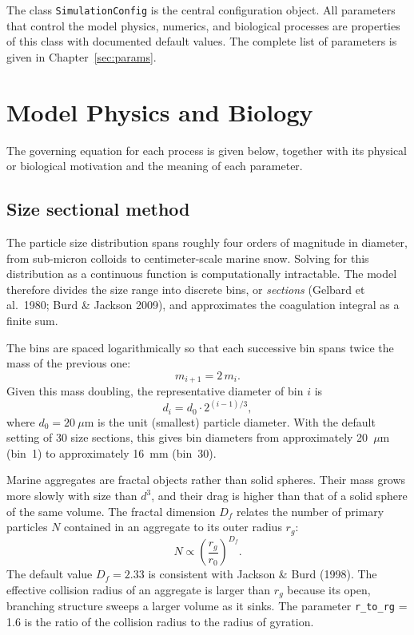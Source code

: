 \documentclass[12pt,a4paper]{report}
\numberwithin{equation}{chapter}
\begin{document}
The class \texttt{SimulationConfig} is the central configuration object.
All parameters that control the model physics, numerics, and biological
processes are properties of this class with documented default values.
The complete list of parameters is given in Chapter~\ref{sec:params}.

\chapter{Model Physics and Biology}
\label{sec:physics}

The governing equation for each process is given below, together with
its physical or biological motivation and the meaning of each parameter.

\section{Size sectional method}

The particle size distribution spans roughly four orders of magnitude in
diameter, from sub-micron colloids to centimeter-scale marine snow. Solving
for this distribution as a continuous function is computationally intractable.
The model therefore divides the size range into discrete bins, or
\emph{sections} (Gelbard et al.\ 1980; Burd \& Jackson 2009), and
approximates the coagulation integral as a finite sum.

The bins are spaced logarithmically so that each successive bin spans twice
the mass of the previous one:
\begin{equation}
    m_{i+1} = 2\,m_i.
    \label{eq:mass_double}
\end{equation}
Given this mass doubling, the representative diameter of bin $i$ is
\begin{equation}
    d_i = d_0 \cdot 2^{(i-1)/3},
    \label{eq:bin_diam}
\end{equation}
where $d_0 = 20~\mu$m is the unit (smallest) particle diameter.
With the default setting of 30 size sections, this gives bin diameters from
approximately 20~$\mu$m (bin~1) to approximately 16~mm (bin~30).

Marine aggregates are fractal objects rather than solid spheres.
Their mass grows more slowly with size than $d^3$, and their drag is
higher than that of a solid sphere of the same volume. The fractal
dimension $D_f$ relates the number of primary particles $N$ contained in
an aggregate to its outer radius $r_g$:
\begin{equation}
    N \propto \left(\frac{r_g}{r_0}\right)^{D_f}.
    \label{eq:fractal}
\end{equation}
The default value $D_f = 2.33$ is consistent with Jackson \& Burd (1998).
The effective collision radius of an aggregate is larger than $r_g$ because
its open, branching structure sweeps a larger volume as it sinks. The parameter
\texttt{r\_to\_rg} = 1.6 is the ratio of the collision radius to the radius
of gyration.
\end{document}
